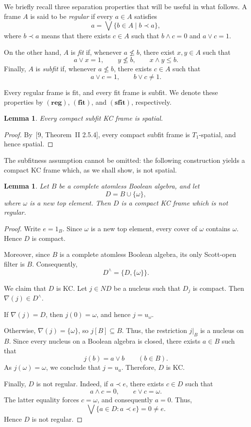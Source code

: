 \documentclass[11pt]{amsart}
\theoremstyle{plain}
\newtheorem{lem}[thm]{Lemma}
\theoremstyle{definition}
\begin{document}
We briefly recall three separation properties that will be useful in what follows. A frame \(A\) is said to be \emph{regular} if every \(a\in A\) satisfies
\[
a=\bigvee\{b\in A\mid b\prec a\},
\]
where \(b\prec a\) means that there exists \(c\in A\) such that \(b\wedge c=0\) and \(a\vee c=1\).

On the other hand, \(A\) is \emph{fit} if, whenever \(a\nleq b\), there exist \(x,y\in A\) such that
\[
a\vee x=1,\qquad y\nleq b,\qquad x\wedge y\leq b.
\]
Finally, \(A\) is \emph{subfit} if, whenever \(a\nleq b\), there exists \(c\in A\) such that
\[
a\vee c=1,\qquad b\vee c\neq 1.
\]

Every regular frame is fit, and every fit frame is subfit. We denote these properties by \(\mathbf{(reg)}\), \(\mathbf{(fit)}\), and \(\mathbf{(sfit)}\), respectively.

\begin{lem}\label{KCespacial}
Every compact subfit KC frame is spatial.
\end{lem}

\begin{proof}
By~[9, Theorem~II 2.5.4], every compact subfit frame is
$T_1$-spatial, and hence spatial.
\end{proof}

The subfitness assumption cannot be omitted: the following
construction yields a compact KC frame which, as we shall
show, is not spatial.

\begin{lem}\label{KCnotreg}
Let $B$ be a complete atomless Boolean algebra, and let
\[
D=B\cup\{\omega\},
\]
where $\omega$ is a new top element. Then $D$ is a
compact KC frame which is not regular.
\end{lem}

\begin{proof}
Write $e=1_B$. Since $\omega$ is a new top element,
every cover of $\omega$ contains $\omega$. Hence
$D$ is compact.

Moreover, since $B$ is a complete atomless Boolean
algebra, its only Scott-open filter is $B$.
Consequently,
\[
D^\wedge=\{D,\{\omega\}\}.
\]

We claim that $D$ is KC. Let $j\in ND$ be a nucleus
such that $D_j$ is compact. Then
$\nabla(j)\in D^\wedge$.

If $\nabla(j)=D$, then $j(0)=\omega$, and hence
$j=u_\omega$.

Otherwise, $\nabla(j)=\{\omega\}$, so
$j[B]\subseteq B$. Thus, the restriction
$j|_B$ is a nucleus on $B$. Since every nucleus
on a Boolean algebra is closed, there exists
$a\in B$ such that
\[
j(b)=a\vee b
\qquad(b\in B).
\]
As $j(\omega)=\omega$, we conclude that $j=u_a$.
Therefore, $D$ is KC.

Finally, $D$ is not regular. Indeed, if
$a\prec e$, there exists $c\in D$ such that
\[
a\wedge c=0,
\qquad
e\vee c=\omega.
\]
The latter equality forces $c=\omega$, and
consequently $a=0$. Thus,
\[
\bigvee\{a\in D:a\prec e\}=0\neq e.
\]
Hence $D$ is not regular.
\end{proof}
\end{document}

